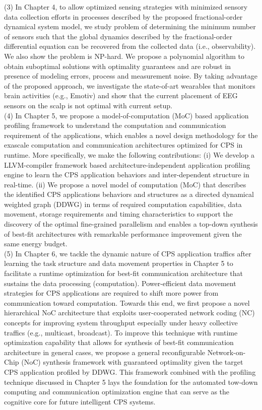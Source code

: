 (3) In Chapter 4, to allow optimized sensing strategies with minimized sensory data collection efforts in processes described by the proposed fractional-order dynamical system model, we study problem of determining the minimum number of sensors such that the global dynamics described by the fractional-order differential equation can be recovered from the collected data (i.e., observability). We also show the problem is NP-hard. We propose a polynomial algorithm to obtain suboptimal solutions with optimality guarantees and are robust in presence of modeling errors, process and measurement noise. By taking advantage of the proposed approach, we investigate the state-of-art wearables that monitors brain activities (e.g., Emotiv) and show that the current placement of EEG sensors on the scalp is not optimal with current setup.\\
(4) In Chapter 5, we propose a model-of-computation (MoC) based application profiling framework to understand the computation and communication requirement of the applications, which enables a novel design methodology for the exascale computation and communication architectures optimized for CPS in runtime.  More specifically, we make the following contributions: (i) We develop a LLVM-compiler framework based architecture-independent application profiling engine to learn the CPS application behaviors and inter-dependent structure in real-time. (ii) We propose a novel model of computation (MoC) that describes the identified CPS applications behaviors and structures as a directed dynamical weighted graph (DDWG) in terms of required computation capabilities, data movement, storage requirements and timing characteristics to support the discovery of the optimal fine-grained parallelism and enables a top-down synthesis of best-fit architectures with remarkable performance improvement given the same energy budget.\\
(5) In Chapter 6, we tackle the dynamic nature of CPS application traffics after learning the task structure and data movement properties in Chapter 5 to facilitate a runtime optimization for best-fit communication architecture that sustains the data processing (computation). Power-efficient data movement strategies for CPS applications are required to shift more power from communication toward computation. Towards this end, we first propose a novel hierarchical NoC architecture that exploits user-cooperated network coding (NC) concepts for improving system throughput especially under heavy collective traffics (e.g., multicast, broadcast). To improve this technique with runtime optimization capability that allows for synthesis of best-fit communication architecture in general cases, we propose a general reconfigurable Network-on-Chip (NoC) synthesis framework with guaranteed optimality given the target CPS application profiled by DDWG. This framework combined with the profiling technique discussed in Chapter 5 lays the foundation for the automated tow-down computing and communication optimization engine that can serve as the cognitive core for future intelligent CPS systems.\\

